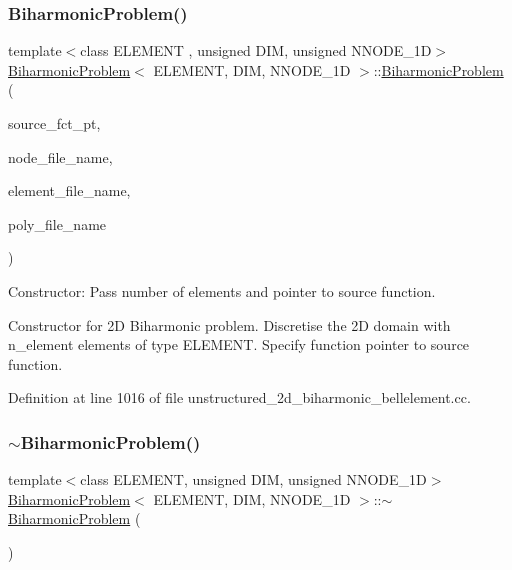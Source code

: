 \subsubsection{\texorpdfstring{Biharmonic\+Problem()}{BiharmonicProblem()}}
{\footnotesize\ttfamily template$<$class E\+L\+E\+M\+E\+NT , unsigned D\+IM, unsigned N\+N\+O\+D\+E\+\_\+1D$>$ \\
\hyperlink{classBiharmonicProblem}{Biharmonic\+Problem}$<$ E\+L\+E\+M\+E\+NT, D\+IM, N\+N\+O\+D\+E\+\_\+1D $>$\+::\hyperlink{classBiharmonicProblem}{Biharmonic\+Problem} (\begin{DoxyParamCaption}\item[{typename \hyperlink{classoomph_1_1MyBiharmonicEquations}{My\+Biharmonic\+Equations}$<$ D\+IM, N\+N\+O\+D\+E\+\_\+1D $>$\+::Source\+Fct\+Pt}]{source\+\_\+fct\+\_\+pt,  }\item[{const string \&}]{node\+\_\+file\+\_\+name,  }\item[{const string \&}]{element\+\_\+file\+\_\+name,  }\item[{const string \&}]{poly\+\_\+file\+\_\+name }\end{DoxyParamCaption})}



Constructor\+: Pass number of elements and pointer to source function. 

Constructor for 2D Biharmonic problem. Discretise the 2D domain with n\+\_\+element elements of type E\+L\+E\+M\+E\+NT. Specify function pointer to source function. 

Definition at line 1016 of file unstructured\+\_\+2d\+\_\+biharmonic\+\_\+bellelement.\+cc.

\mbox{\label{classBiharmonicProblem_aaa512f8c05170aa4a7b97e175db642f3}} 
\subsubsection{\texorpdfstring{$\sim$\+Biharmonic\+Problem()}{~BiharmonicProblem()}}
{\footnotesize\ttfamily template$<$class E\+L\+E\+M\+E\+NT, unsigned D\+IM, unsigned N\+N\+O\+D\+E\+\_\+1D$>$ \\
\hyperlink{classBiharmonicProblem}{Biharmonic\+Problem}$<$ E\+L\+E\+M\+E\+NT, D\+IM, N\+N\+O\+D\+E\+\_\+1D $>$\+::$\sim$\hyperlink{classBiharmonicProblem}{Biharmonic\+Problem} (\begin{DoxyParamCaption}{ }\end{DoxyParamCaption})\hspace{0.3cm}{\ttfamily [inline]}}



